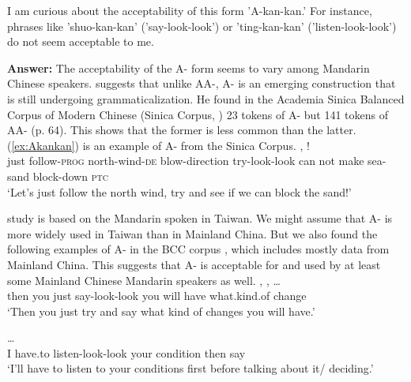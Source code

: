 \documentclass[fleqn,twoside]{article}
\begin{document}
\begin{enumerate}
I am curious about the acceptability of this form 'A-kan-kan.' For instance, phrases like 'shuo-kan-kan' ('say-look-look') or 'ting-kan-kan' ('listen-look-look') do not seem acceptable to me. 

\textbf{Answer:}
The acceptability of the A- form seems to vary among Mandarin Chinese speakers.
\citet[73]{Cheng2012} suggests that unlike AA-, A- is an emerging construction that is still undergoing grammaticalization.
He found in the Academia Sinica Balanced Corpus of Modern Chinese (Sinica Corpus, \citealt{sinica}) 23 tokens of A- but 141 tokens of AA- (p. 64).
This shows that the former is less common than the latter.
(\ref{ex:Akankan}) is an example of A- from the Sinica Corpus.
\ea\label{ex:Akankan} %
\gll {}   ,       !\\
just follow-\textsc{prog} north-wind-\textsc{de} blow-direction try-look-look can not make sea-sand block-down \textsc{ptc}\\
\glt `Let's just follow the north wind, try and see if we can block the sand!'
\z 

 study is based on the Mandarin spoken in Taiwan.
We might assume that A- is more widely used in Taiwan than in Mainland China.
But we also found the following examples of A- in the BCC corpus \citep{BCC}, which includes mostly data from Mainland China.
This suggests that A- is acceptable for and used by at least some Mainland Chinese Mandarin speakers as well.
\ea %
\gll {},   ,     \ldots\\
then you just say-look-look you will have what.kind.of change\\
\glt `Then you just try and say what kind of changes you will have.'
\z

\ea %
\gll {}      \ldots\\
I have.to listen-look-look your condition then say\\
\glt `I'll have to listen to your conditions first before talking about it/ deciding.'
\z


\end{enumerate}
\end{document}

